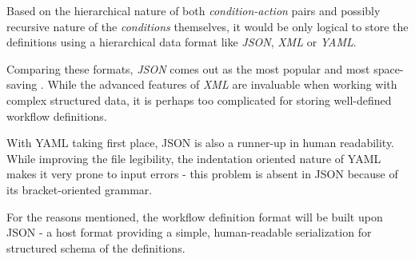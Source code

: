 Based on the hierarchical nature of both \textit{condition-action} pairs and possibly recursive nature of the \textit{conditions} themselves, it would be only logical to store the definitions using a hierarchical data format like \textit{JSON}, \textit{XML} or \textit{YAML}.

Comparing these formats, \textit{JSON} comes out as the most popular  and most space-saving . 
While the advanced features of \textit{XML} are invaluable when working with complex structured data, it is perhaps too complicated for storing well-defined workflow definitions.

With YAML taking first place, JSON is also a runner-up in human readability.
While improving the file legibility, the indentation oriented nature of YAML makes it very prone to input errors - this problem is absent in JSON because of its bracket-oriented grammar.

For the reasons mentioned, the workflow definition format will be built upon JSON - a host format providing a simple, human-readable serialization for structured schema of the definitions.

\subsubsection{}